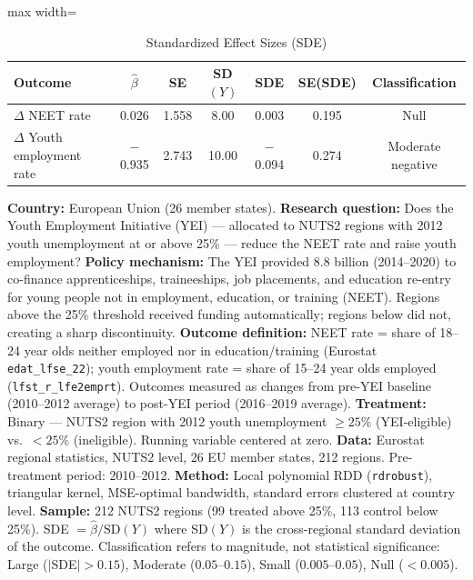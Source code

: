\begin{table}[h!]
\centering
\caption{Standardized Effect Sizes (SDE)}
\label{tab:sde}
\begin{adjustbox}{max width=\textwidth}
\begin{tabular}{lcccccc}
\toprule
Outcome & $\hat{\beta}$ & SE & SD$(Y)$ & SDE & SE(SDE) & Classification \\
\midrule
$\Delta$ NEET rate & 0.026 & 1.558 & 8.00 & 0.003 & 0.195 & Null \\
$\Delta$ Youth employment rate & $-$0.935 & 2.743 & 10.00 & $-$0.094 & 0.274 & Moderate negative \\
\bottomrule
\end{tabular}
\end{adjustbox}

\raggedright\scriptsize
\textbf{Country:} European Union (26 member states). \textbf{Research question:} Does the Youth Employment Initiative (YEI) --- allocated to NUTS2 regions with 2012 youth unemployment at or above 25\% --- reduce the NEET rate and raise youth employment? \textbf{Policy mechanism:} The YEI provided \texteuro{}8.8 billion (2014--2020) to co-finance apprenticeships, traineeships, job placements, and education re-entry for young people not in employment, education, or training (NEET). Regions above the 25\% threshold received funding automatically; regions below did not, creating a sharp discontinuity. \textbf{Outcome definition:} NEET rate = share of 18--24 year olds neither employed nor in education/training (Eurostat \texttt{edat\_lfse\_22}); youth employment rate = share of 15--24 year olds employed (\texttt{lfst\_r\_lfe2emprt}). Outcomes measured as changes from pre-YEI baseline (2010--2012 average) to post-YEI period (2016--2019 average). \textbf{Treatment:} Binary --- NUTS2 region with 2012 youth unemployment $\geq 25\%$ (YEI-eligible) vs.\ $< 25\%$ (ineligible). Running variable centered at zero. \textbf{Data:} Eurostat regional statistics, NUTS2 level, 26 EU member states, 212 regions. Pre-treatment period: 2010--2012. \textbf{Method:} Local polynomial RDD (\texttt{rdrobust}), triangular kernel, MSE-optimal bandwidth, standard errors clustered at country level. \textbf{Sample:} 212 NUTS2 regions (99 treated above 25\%, 113 control below 25\%). SDE $= \hat{\beta} / \text{SD}(Y)$ where SD$(Y)$ is the cross-regional standard deviation of the outcome. Classification refers to magnitude, not statistical significance: Large ($|$SDE$| > 0.15$), Moderate ($0.05$--$0.15$), Small ($0.005$--$0.05$), Null ($< 0.005$).
\end{table}
